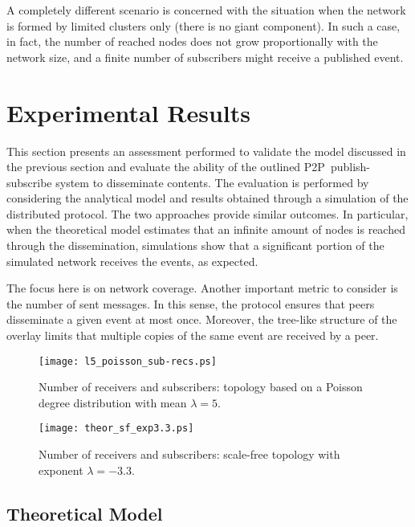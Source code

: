 \documentclass[10pt, conference, compsocconf]{IEEEtran}
\begin{document}
A completely different scenario is concerned with the situation when the network is formed by limited clusters only (there is no giant component). In such a case, in fact, the number of reached nodes does not grow proportionally with the network size, and a finite number of subscribers might receive a published event.

\section{Experimental Results}\label{sec:exp}

This section presents an assessment performed to validate the model discussed in the previous section and evaluate the ability of the outlined \ac{P2P}~publish-subscribe system to disseminate contents. The evaluation is performed by considering the analytical model and results obtained through a simulation of the distributed protocol. The two approaches provide similar outcomes. In particular, when the theoretical model estimates that an infinite amount of nodes is reached through the dissemination, simulations show that a significant portion of the simulated network receives the events, as expected.

The focus here is on network coverage. Another important metric to consider is the number of sent messages. In this sense, the protocol ensures that peers disseminate a given event at most once.
Moreover, the tree-like structure of the overlay limits that multiple copies of the same event are received by a peer.


\begin{figure}[t]
   \centering
   \texttt{[image: l5\_poisson\_sub-recs.ps]}
   \caption{Number of receivers and subscribers: topology based on a Poisson degree distribution with mean $\lambda=5$.}
   \label{fig:poisson_l5_sub}
\end{figure}

\begin{figure}[t]
   \centering
   \texttt{[image: theor\_sf\_exp3.3.ps]}
   \caption{Number of receivers and subscribers: scale-free topology with exponent $\lambda=-3.3$.}
   \label{fig:sf_sub}
\end{figure}


\subsection{Theoretical Model}
\end{document}

